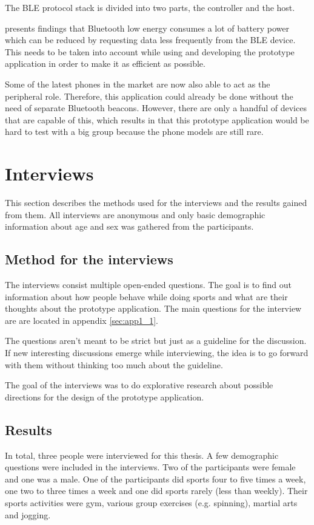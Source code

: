The BLE protocol stack is divided into two parts, the controller and the host.

\citep{bluetoothOverview} presents findings that Bluetooth low energy consumes a lot of battery power which can be reduced by requesting data less frequently from the BLE device. This needs to be taken into account while using and developing the prototype application in order to make it as efficient as possible.

Some of the latest phones in the market are now also able to act as the peripheral role. Therefore, this application could already be done without the need of separate Bluetooth beacons. However, there are only a handful of devices that are capable of this, which results in that this prototype application would be hard to test with a big group because the phone models are still rare.

\section{Interviews}

This section describes the methods used for the interviews and the results gained from them. All interviews are anonymous and only basic demographic information about age and sex was gathered from the participants.

\subsection{Method for the interviews}

The interviews consist multiple open-ended questions. The goal is to find out information about how people behave while doing sports and what are their thoughts about the prototype application. The main questions for the interview are are located in appendix \ref{sec:app1_1}.

The questions aren't meant to be strict but just as a guideline for the discussion. If new interesting discussions emerge while interviewing, the idea is to go forward with them without thinking too much about the guideline.

The goal of the interviews was to do explorative research about possible directions for the design of the prototype application.

\subsection{Results}

In total, three people were interviewed for this thesis. A few demographic questions were included in the interviews. Two of the participants were female and one was  a male. One of the participants did sports four to five times a week, one two to three times a week and one did sports rarely (less than weekly). Their sports activities were gym, various group exercises (e.g. spinning), martial arts and jogging.

